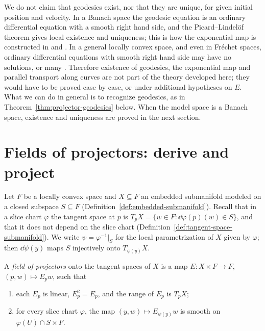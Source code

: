 \begin{remark}
  \label{rem:conn-no-existence}
  We do not claim that geodesics exist, nor that they are unique, for given initial position and
  velocity. In a Banach space the geodesic equation is an ordinary differential equation with a
  smooth right hand side, and the Picard--Lindel\"of theorem gives local existence and
  uniqueness; this is how the exponential map is constructed in \cite{Lan99} and \cite{Lar26}.
  In a general locally convex space, and even in Fr\'echet spaces, ordinary differential equations
  with smooth right hand side may have no solutions, or many \cite[Part~I, 5.6.1]{Ham82}. Therefore existence of geodesics,
  the exponential map and parallel transport along curves are not part of the theory developed
  here; they would have to be proved case by case, or under additional hypotheses on $E$.
  What we can do in general is to recognize geodesics, as in Theorem~\ref{thm:projector-geodesics}
  below. When the model space is a Banach space, existence and uniqueness are proved in the next
  section.
\end{remark}

\section{Fields of projectors: derive and project}
\label{sec:conn-projectors}

Let $F$ be a locally convex space and $X \subseteq F$ an embedded submanifold modeled on a closed
subspace $S \subseteq F$ (Definition~\ref{def:embedded-submanifold}). Recall that in a slice chart
$\varphi$ the tangent space at $p$ is $T_p X = \{w \in F : \dd\varphi(p)(w) \in S\}$, and that it
does not depend on the slice chart (Definition~\ref{def:tangent-space-submanifold}). We write
$\psi = \varphi^{-1}|_S$ for the local parametrization of $X$ given by $\varphi$; then
$\dd\psi(y)$ maps $S$ injectively onto $T_{\psi(y)} X$.

\begin{definition}
  \label{def:projector-field}
  \leanok
  A \emph{field of projectors} onto the tangent spaces of $X$ is a map
  $E \colon X \times F \to F$, $(p, w) \mapsto E_p w$, such that
  \begin{enumerate}
    \item each $E_p$ is linear, $E_p^2 = E_p$, and the range of $E_p$ is $T_p X$;
    \item for every slice chart $\varphi$, the map $(y, w) \mapsto E_{\psi(y)} w$ is smooth on
    $\varphi(U) \cap S \times F$.
  \end{enumerate}
\end{definition}

